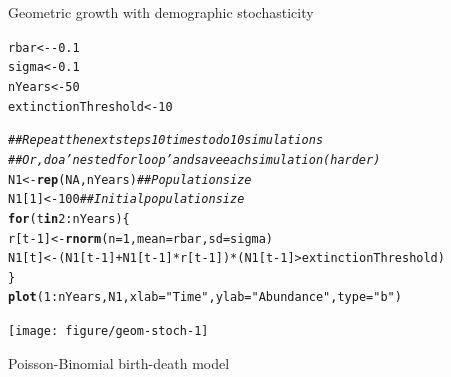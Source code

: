 \documentclass[12pt]{article}\usepackage[]{graphicx}\usepackage[]{xcolor}
\makeatletter
\newcommand{\hlnum}[1]{\textcolor[rgb]{0.686,0.059,0.569}{#1}}%
\newcommand{\hlstr}[1]{\textcolor[rgb]{0.192,0.494,0.8}{#1}}%
\newcommand{\hlcom}[1]{\textcolor[rgb]{0.678,0.584,0.686}{\textit{#1}}}%
\newcommand{\hlopt}[1]{\textcolor[rgb]{0,0,0}{#1}}%
\newcommand{\hlstd}[1]{\textcolor[rgb]{0.345,0.345,0.345}{#1}}%
\newcommand{\hlkwa}[1]{\textcolor[rgb]{0.161,0.373,0.58}{\textbf{#1}}}%
\newcommand{\hlkwb}[1]{\textcolor[rgb]{0.69,0.353,0.396}{#1}}%
\newcommand{\hlkwc}[1]{\textcolor[rgb]{0.333,0.667,0.333}{#1}}%
\newcommand{\hlkwd}[1]{\textcolor[rgb]{0.737,0.353,0.396}{\textbf{#1}}}%
\newenvironment{kframe}{%
 \def\at@end@of@kframe{}%
 \ifinner\ifhmode%
  \def\at@end@of@kframe{\end{minipage}}%
  \begin{minipage}{\columnwidth}%
 \fi\fi%
 \def\FrameCommand##1{\hskip\@totalleftmargin \hskip-\fboxsep
 \colorbox{shadecolor}{##1}\hskip-\fboxsep
     \hskip-\linewidth \hskip-\@totalleftmargin \hskip\columnwidth}%
 \MakeFramed {\advance\hsize-\width
   \@totalleftmargin\z@ \linewidth\hsize
   \@setminipage}}%
 {\par\unskip\endMakeFramed%
 \at@end@of@kframe}
\newenvironment{knitrout}{}{} %
\makeatother
\begin{document}
Geometric growth with demographic stochasticity
\begin{knitrout}
\color{fgcolor}\begin{kframe}
\begin{alltt}
\hlstd{rbar} \hlkwb{<-} \hlopt{-}\hlnum{0.1}
\hlstd{sigma} \hlkwb{<-} \hlnum{0.1}
\hlstd{nYears} \hlkwb{<-} \hlnum{50}
\hlstd{extinctionThreshold} \hlkwb{<-} \hlnum{10}

\hlcom{## Repeat the next steps 10 times to do 10 simulations}
\hlcom{## Or, do a 'nested for loop' and save each simulation (harder)}
\hlstd{N1} \hlkwb{<-} \hlkwd{rep}\hlstd{(}\hlnum{NA}\hlstd{, nYears)}  \hlcom{## Population size }
\hlstd{N1[}\hlnum{1}\hlstd{]} \hlkwb{<-} \hlnum{100}           \hlcom{## Initial population size}
\hlkwa{for}\hlstd{(t} \hlkwa{in} \hlnum{2}\hlopt{:}\hlstd{nYears) \{}
    \hlstd{r[t}\hlopt{-}\hlnum{1}\hlstd{]} \hlkwb{<-} \hlkwd{rnorm}\hlstd{(}\hlkwc{n}\hlstd{=}\hlnum{1}\hlstd{,} \hlkwc{mean}\hlstd{=rbar,} \hlkwc{sd}\hlstd{=sigma)}
    \hlstd{N1[t]} \hlkwb{<-} \hlstd{(N1[t}\hlopt{-}\hlnum{1}\hlstd{]} \hlopt{+} \hlstd{N1[t}\hlopt{-}\hlnum{1}\hlstd{]}\hlopt{*}\hlstd{r[t}\hlopt{-}\hlnum{1}\hlstd{])}\hlopt{*}\hlstd{(N1[t}\hlopt{-}\hlnum{1}\hlstd{]}\hlopt{>}\hlstd{extinctionThreshold)}
\hlstd{\}}
\hlkwd{plot}\hlstd{(}\hlnum{1}\hlopt{:}\hlstd{nYears, N1,} \hlkwc{xlab}\hlstd{=}\hlstr{"Time"}\hlstd{,} \hlkwc{ylab}\hlstd{=}\hlstr{"Abundance"}\hlstd{,} \hlkwc{type}\hlstd{=}\hlstr{"b"}\hlstd{)}
\end{alltt}
\end{kframe}

{\centering \texttt{[image: figure/geom-stoch-1]} 

}


\end{knitrout}


\newpage

Poisson-Binomial birth-death model
\end{document}

